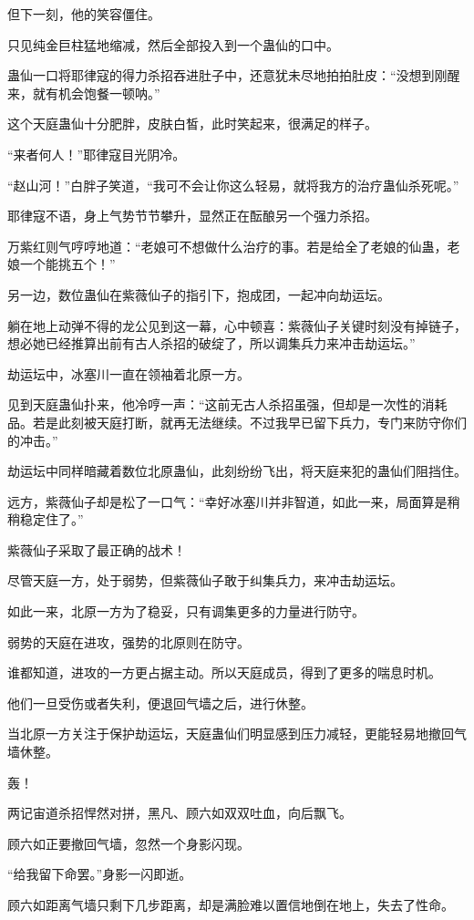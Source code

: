 \begin{this_body}
但下一刻，他的笑容僵住。

只见纯金巨柱猛地缩减，然后全部投入到一个蛊仙的口中。

蛊仙一口将耶律寇的得力杀招吞进肚子中，还意犹未尽地拍拍肚皮：“没想到刚醒来，就有机会饱餐一顿呐。”

这个天庭蛊仙十分肥胖，皮肤白皙，此时笑起来，很满足的样子。

“来者何人！”耶律寇目光阴冷。

“赵山河！”白胖子笑道，“我可不会让你这么轻易，就将我方的治疗蛊仙杀死呢。”

耶律寇不语，身上气势节节攀升，显然正在酝酿另一个强力杀招。

万紫红则气哼哼地道：“老娘可不想做什么治疗的事。若是给全了老娘的仙蛊，老娘一个能挑五个！”

另一边，数位蛊仙在紫薇仙子的指引下，抱成团，一起冲向劫运坛。

躺在地上动弹不得的龙公见到这一幕，心中顿喜：紫薇仙子关键时刻没有掉链子，想必她已经推算出前有古人杀招的破绽了，所以调集兵力来冲击劫运坛。”

劫运坛中，冰塞川一直在领袖着北原一方。

见到天庭蛊仙扑来，他冷哼一声：“这前无古人杀招虽强，但却是一次性的消耗品。若是此刻被天庭打断，就再无法继续。不过我早已留下兵力，专门来防守你们的冲击。”

劫运坛中同样暗藏着数位北原蛊仙，此刻纷纷飞出，将天庭来犯的蛊仙们阻挡住。

远方，紫薇仙子却是松了一口气：“幸好冰塞川并非智道，如此一来，局面算是稍稍稳定住了。”

紫薇仙子采取了最正确的战术！

尽管天庭一方，处于弱势，但紫薇仙子敢于纠集兵力，来冲击劫运坛。

如此一来，北原一方为了稳妥，只有调集更多的力量进行防守。

弱势的天庭在进攻，强势的北原则在防守。

谁都知道，进攻的一方更占据主动。所以天庭成员，得到了更多的喘息时机。

他们一旦受伤或者失利，便退回气墙之后，进行休整。

当北原一方关注于保护劫运坛，天庭蛊仙们明显感到压力减轻，更能轻易地撤回气墙休整。

轰！

两记宙道杀招悍然对拼，黑凡、顾六如双双吐血，向后飘飞。

顾六如正要撤回气墙，忽然一个身影闪现。

“给我留下命罢。”身影一闪即逝。

顾六如距离气墙只剩下几步距离，却是满脸难以置信地倒在地上，失去了性命。


\end{this_body}
